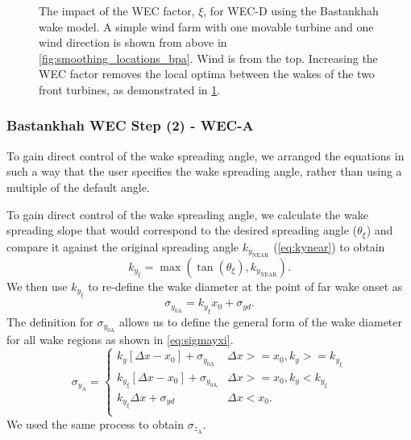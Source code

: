 \documentclass{jpconf}
\begin{document}
\begin{figure}[h!]
\begin{subfigure}[t]{0.47\textwidth}
		\caption{}
		\label{fig:smoothing_bpa_wec_d}
	\end{subfigure}
	\caption{The impact of the WEC factor, $\xi$, for WEC-D using the Bastankhah wake model. A simple wind farm with one movable turbine and one wind direction is shown from above in \cref{fig:smoothing_locations_bpa}. Wind is from the top. Increasing the WEC factor removes the local optima between the wakes of the two front turbines, as demonstrated in \cref{fig:smoothing_bpa_wec_d}.}
	\label{fig:wec_bpa_wec_d}
\end{figure}

\subsubsection{Bastankhah WEC Step (2) - WEC-A}
To gain direct control of the wake spreading angle, we arranged the equations in such a way that the user specifies the wake spreading angle, rather than using a multiple of the default angle. 

To gain direct control of the wake spreading angle, we calculate the wake spreading slope that would correspond to the desired spreading angle ($\theta_\xi$) and compare  it against the original spreading angle $k_{y_{\text{NEAR}}}$ (\cref{eq:kynear}) to obtain
%
\begin{equation}
	k_{y_{\xi}} = \max(\tan{(\theta_\xi)}, k_{y_{\text{NEAR}}}).
\end{equation}
%
We then use $k_{y_{\xi}}$ to re-define the wake diameter at the point of far wake onset as
%
\begin{equation}\label{eq:sigmay0xi}
	\sigma_{y_{0\text{A}}} = k_{y_{\xi}}x_0+\sigma_{yd}.
\end{equation}
%
The definition for $\sigma_{y_{0\text{A}}}$ allows us to define the general form of the wake diameter for all wake regions as shown in \cref{eq:sigmayxi}. 
%
\begin{equation}\label{eq:sigmayxi}
	\sigma_{y_{\text{A}}} =
	\begin{cases} k_y [\Delta x-x_0]+\sigma_{y_{0\text{A}}} & \Delta x >= x_0, k_y >= k_{y_{\xi}} \\
		k_{y_{\xi}} [\Delta x-x_0]+\sigma_{y_{0\text{A}}} & \Delta x >= x_0, k_y < k_{y_{\xi}} \\
		k_{y_{\xi}}\Delta x+\sigma_{yd} & \Delta x < x_0. \\
	\end{cases}
\end{equation}
%
We used the same process to obtain $\sigma_{z_{\text{A}}}$. 
\end{document}
